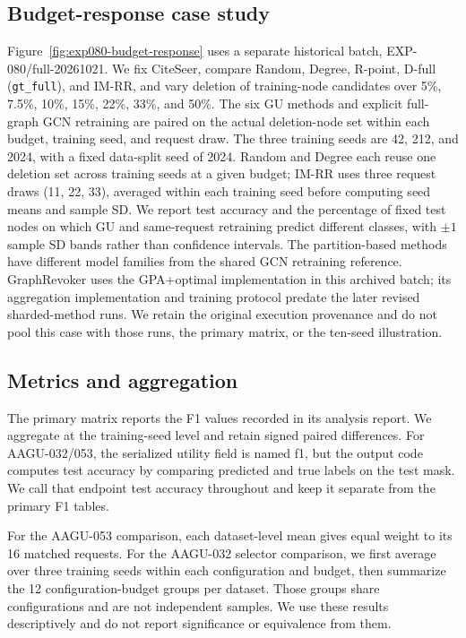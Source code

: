 \subsection{Budget-response case study}
Figure~\ref{fig:exp080-budget-response} uses a separate historical batch, EXP-080/full-20261021. We fix CiteSeer, compare Random, Degree, R-point, D-full (\texttt{gt\_full}), and IM-RR, and vary deletion of training-node candidates over 5\%, 7.5\%, 10\%, 15\%, 22\%, 33\%, and 50\%. The six GU methods and explicit full-graph GCN retraining are paired on the actual deletion-node set within each budget, training seed, and request draw. The three training seeds are 42, 212, and 2024, with a fixed data-split seed of 2024. Random and Degree each reuse one deletion set across training seeds at a given budget; IM-RR uses three request draws (11, 22, 33), averaged within each training seed before computing seed means and sample SD. We report test accuracy and the percentage of fixed test nodes on which GU and same-request retraining predict different classes, with $\pm1$ sample SD bands rather than confidence intervals. The partition-based methods have different model families from the shared GCN retraining reference. GraphRevoker uses the GPA+optimal implementation in this archived batch; its aggregation implementation and training protocol predate the later revised sharded-method runs. We retain the original execution provenance and do not pool this case with those runs, the primary matrix, or the ten-seed illustration.

\subsection{Metrics and aggregation}
The primary matrix reports the F1 values recorded in its analysis report. We aggregate at the training-seed level and retain signed paired differences. For AAGU-032/053, the serialized utility field is named f1, but the output code computes test accuracy by comparing predicted and true labels on the test mask. We call that endpoint test accuracy throughout and keep it separate from the primary F1 tables.

For the AAGU-053 comparison, each dataset-level mean gives equal weight to its 16 matched requests. For the AAGU-032 selector comparison, we first average over three training seeds within each configuration and budget, then summarize the 12 configuration-budget groups per dataset. Those groups share configurations and are not independent samples. We use these results descriptively and do not report significance or equivalence from them.
